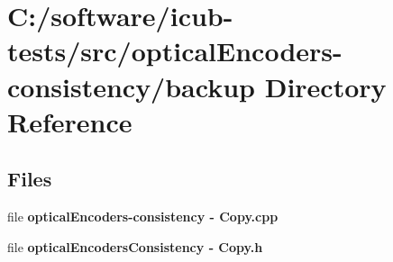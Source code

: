\section{C\+:/software/icub-\/tests/src/optical\+Encoders-\/consistency/backup Directory Reference}
\label{dir_bbdfa1361df38a3ac69e875a79726829}
\subsection*{Files}
\begin{DoxyCompactItemize}
\item 
file {\bfseries optical\+Encoders-\/consistency -\/ Copy.\+cpp}
\item 
file {\bfseries optical\+Encoders\+Consistency -\/ Copy.\+h}
\end{DoxyCompactItemize}

